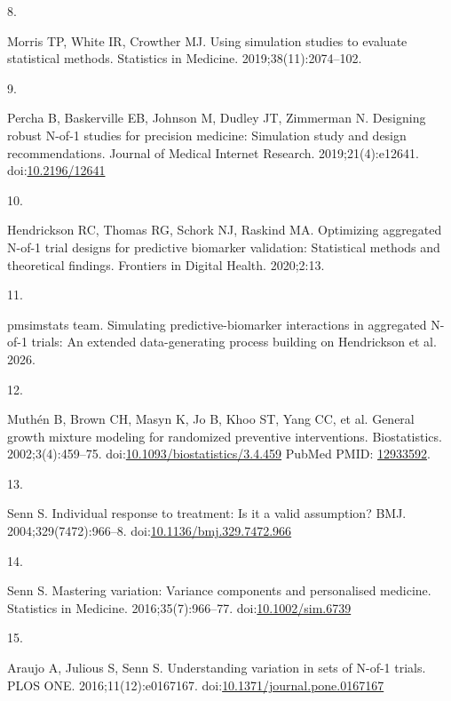\documentclass[
  11pt,
]{article}
\newlength{\cslhangindent}
\newlength{\csllabelwidth}
\newenvironment{CSLReferences}[2] %
 {\begin{list}{}{%
  \setlength{\itemindent}{0pt}
  \setlength{\leftmargin}{0pt}
  \setlength{\parsep}{0pt}
  \ifodd #1
   \setlength{\leftmargin}{\cslhangindent}
   \setlength{\itemindent}{-1\cslhangindent}
  \fi
  \setlength{\itemsep}{#2\baselineskip}}}
 {\end{list}}
\newcommand{\CSLLeftMargin}[1]{\parbox[t]{\csllabelwidth}{\strut#1\strut}}
\newcommand{\CSLRightInline}[1]{\parbox[t]{\linewidth - \csllabelwidth}{\strut#1\strut}}
\begin{document}
\begin{CSLReferences}{0}{1}
\CSLLeftMargin{8. }%
\CSLRightInline{Morris TP, White IR, Crowther MJ. Using simulation studies to evaluate statistical methods. Statistics in Medicine. 2019;38(11):2074--102.}

\CSLLeftMargin{9. }%
\CSLRightInline{Percha B, Baskerville EB, Johnson M, Dudley JT, Zimmerman N. Designing robust {N}-of-1 studies for precision medicine: Simulation study and design recommendations. Journal of Medical Internet Research. 2019;21(4):e12641. doi:\href{https://doi.org/10.2196/12641}{10.2196/12641}}

\CSLLeftMargin{10. }%
\CSLRightInline{Hendrickson RC, Thomas RG, Schork NJ, Raskind MA. Optimizing aggregated {N}-of-1 trial designs for predictive biomarker validation: Statistical methods and theoretical findings. Frontiers in Digital Health. 2020;2:13.}

\CSLLeftMargin{11. }%
\CSLRightInline{{pmsimstats team}. Simulating predictive-biomarker interactions in aggregated {N}-of-1 trials: An extended data-generating process building on {H}endrickson et al. 2026.}

\CSLLeftMargin{12. }%
\CSLRightInline{Muthén B, Brown CH, Masyn K, Jo B, Khoo ST, Yang CC, et al. General growth mixture modeling for randomized preventive interventions. Biostatistics. 2002;3(4):459--75. doi:\href{https://doi.org/10.1093/biostatistics/3.4.459}{10.1093/biostatistics/3.4.459} PubMed PMID: \href{https://www.ncbi.nlm.nih.gov/pubmed/12933592}{12933592}.}

\CSLLeftMargin{13. }%
\CSLRightInline{Senn S. Individual response to treatment: Is it a valid assumption? BMJ. 2004;329(7472):966--8. doi:\href{https://doi.org/10.1136/bmj.329.7472.966}{10.1136/bmj.329.7472.966}}

\CSLLeftMargin{14. }%
\CSLRightInline{Senn S. Mastering variation: Variance components and personalised medicine. Statistics in Medicine. 2016;35(7):966--77. doi:\href{https://doi.org/10.1002/sim.6739}{10.1002/sim.6739}}

\CSLLeftMargin{15. }%
\CSLRightInline{Araujo A, Julious S, Senn S. Understanding variation in sets of {N}-of-1 trials. PLOS ONE. 2016;11(12):e0167167. doi:\href{https://doi.org/10.1371/journal.pone.0167167}{10.1371/journal.pone.0167167}}


\end{CSLReferences}
\end{document}
